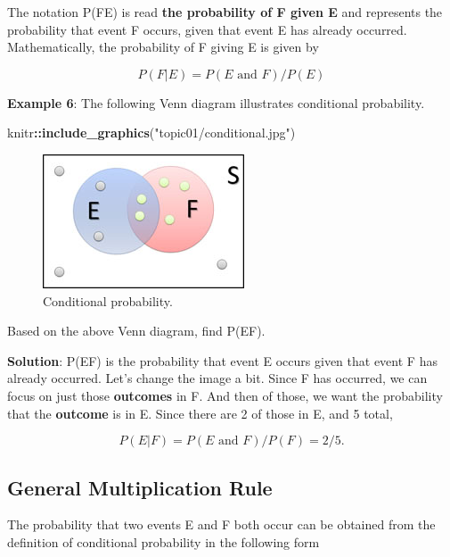 \documentclass[
]{book}
\newenvironment{Shaded}{\begin{snugshade}}{\end{snugshade}}
\newcommand{\FunctionTok}[1]{\textcolor[rgb]{0.13,0.29,0.53}{\textbf{#1}}}
\newcommand{\NormalTok}[1]{#1}
\newcommand{\SpecialCharTok}[1]{\textcolor[rgb]{0.81,0.36,0.00}{\textbf{#1}}}
\newcommand{\StringTok}[1]{\textcolor[rgb]{0.31,0.60,0.02}{#1}}
\begin{document}
The notation P(F\textbar E) is read \textbf{the probability of F given E} and represents the probability that event F occurs, given that event E has already occurred. Mathematically, the probability of F giving E is given by

\[P(F|E) = P(E \mbox{ and } F) / P(E)\]

\textbf{Example 6}: The following Venn diagram illustrates conditional probability.

\begin{Shaded}
\begin{Highlighting}[]
\NormalTok{knitr}\SpecialCharTok{::}\FunctionTok{include\_graphics}\NormalTok{(}\StringTok{"topic01/conditional.jpg"}\NormalTok{)}
\end{Highlighting}
\end{Shaded}

\begin{figure}

{\centering \includegraphics[width=0.3\linewidth]{topic01/conditional} 

}

\caption{Conditional probability.}\label{fig:unnamed-chunk-27}
\end{figure}

Based on the above Venn diagram, find P(E\textbar F).

\textbf{Solution}: P(E\textbar F) is the probability that event E occurs given that event F has already occurred. Let's change the image a bit. Since F has occurred, we can focus on just those \textbf{outcomes} in F. And then of those, we want the probability that the \textbf{outcome} is in E. Since there are 2 of those in E, and 5 total,

\[P(E|F) = P(E \mbox{ and } F) / P(F) = 2/5.\]

\hypertarget{general-multiplication-rule}{%
\subsection{General Multiplication Rule}\label{general-multiplication-rule}}

The probability that two events E and F both occur can be obtained from the definition of conditional probability in the following form
\end{document}
